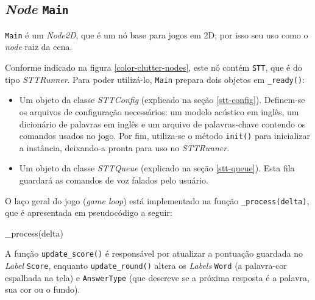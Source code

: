 
\subsection{\textit{Node} \texttt{Main}}

\texttt{Main} é um \textit{Node2D}, que é um nó base para jogos em 2D; por isso seu uso como o \textit{node} raiz da cena.

Conforme indicado na figura \ref{color-clutter-nodes}, este nó contém \texttt{STT}, que é do tipo \textit{STTRunner}. Para poder utilizá-lo, \texttt{Main} prepara dois objetos em \texttt{\_ready()}:

\begin{itemize}
\item Um objeto da classe \textit{STTConfig} (explicado na seção \ref{stt-config}). Definem-se os arquivos de configuração necessários: um modelo acústico em inglês, um dicionário de palavras em inglês e um arquivo de palavras-chave contendo os comandos usados no jogo. Por fim, utiliza-se o método \texttt{init()} para inicializar a instância, deixando-a pronta para uso no \textit{STTRunner}.

\item Um objeto da classe \textit{STTQueue} (explicado na seção \ref{stt-queue}). Esta fila guardará as comandos de voz falados pelo usuário.
\end{itemize}

O laço geral do jogo (\textit{game loop}) está implementado na função \texttt{\_process(delta)}, que é apresentada em pseudocódigo a seguir:

\begin{algorithm}
\begin{algorithmic}[1]
\Function{}{} {\_process}(delta)
\EndIf
\State
{}
    \EndIf
{}
    \EndIf
\EndIf
\State
{}
\EndIf
\EndFunction
\end{algorithmic}
\end{algorithm}

A função \texttt{update\_score()} é responsável por atualizar a pontuação guardada no \textit{Label} \texttt{Score}, enquanto \texttt{update\_round()} altera os \textit{Labels} \texttt{Word} (a palavra-cor espalhada na tela) e \texttt{AnswerType} (que descreve se a próxima resposta é a palavra, sua cor ou o fundo).

